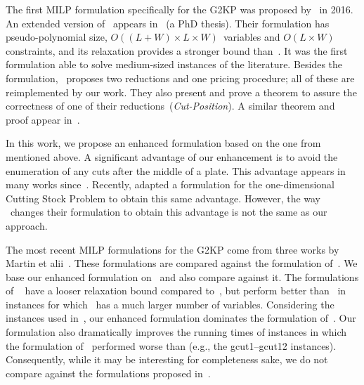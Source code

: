 \documentclass[smallextended]{svjour3}       %
\begin{document}
The first MILP formulation specifically for the G2KP was proposed by~\cite{furini:2016} in 2016.
An extended version of~\cite{furini:2016} appears in~\cite{dimitri_thesis} (a PhD thesis).
Their formulation has pseudo-polynomial size, \(O((L + W) \times L \times W)\)~variables and \(O(L \times W)\) constraints, and its relaxation provides a stronger bound than~\cite{messaoud:2008}.
It was the first formulation able to solve medium-sized instances of the literature.
Besides the formulation, \cite{furini:2016}~proposes two reductions and one pricing procedure; all of these are reimplemented by our work.
They also present and prove a theorem to assure the correctness of one of their reductions~(\emph{Cut-Position}).
A similar theorem and proof appear in~\cite{song:2010}.

In this work, we propose an enhanced formulation based on the one from \cite{furini:2016} mentioned above.
A significant advantage of our enhancement is to avoid the enumeration of any cuts after the middle of a plate.
This advantage appears in many works since~\cite{herz:1972}.
Recently, \cite{delorme:2019} adapted a formulation for the one-dimensional Cutting Stock Problem to obtain this same advantage.
However, the way \cite{delorme:2019}~changes their formulation to obtain this advantage is not the same as our approach.

The most recent MILP formulations for the G2KP come from three works by Martin et alii~\cite{martin:2020:models,martin:2020:bottom,martin:2020:top}.
These formulations are compared against the formulation of~\cite{furini:2016}.
We base our enhanced formulation on~\cite{furini:2016} and also compare against it.
The formulations of ~\cite{martin:2020:models,martin:2020:bottom,martin:2020:top}
have a looser relaxation bound compared to~\cite{furini:2016}, but perform better than~\cite{furini:2016} in instances for which~\cite{furini:2016} has a much larger number of variables.
Considering the instances used in~\cite{furini:2016}, our enhanced formulation dominates the formulation of~\cite{furini:2016}.
Our formulation also dramatically improves the running times of instances in which the formulation of~\cite{furini:2016} performed worse than \cite{martin:2020:models,martin:2020:bottom,martin:2020:top} (e.g., the gcut1--gcut12 instances).
Consequently, while it may be interesting for completeness sake, we do not compare against the formulations proposed in~\cite{martin:2020:models,martin:2020:bottom,martin:2020:top}.
\end{document}

